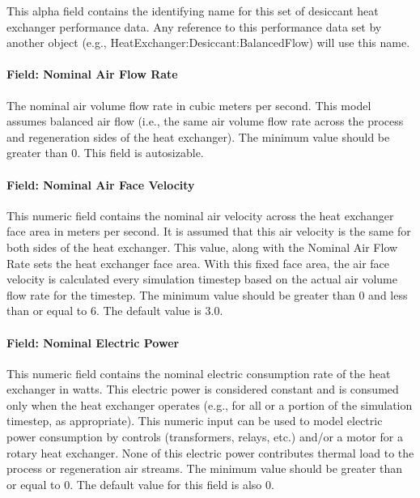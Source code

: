 This alpha field contains the identifying name for this set of desiccant heat exchanger performance data. Any reference to this performance data set by another object (e.g., HeatExchanger:Desiccant:BalancedFlow) will use this name.

\paragraph{Field: Nominal Air Flow Rate}\label{field-nominal-air-flow-rate}

The nominal air volume flow rate in cubic meters per second. This model assumes balanced air flow (i.e., the same air volume flow rate across the process and regeneration sides of the heat exchanger). The minimum value should be greater than 0. This field is autosizable.

\paragraph{Field: Nominal Air Face Velocity}\label{field-nominal-air-face-velocity}

This numeric field contains the nominal air velocity across the heat exchanger face area in meters per second. It is assumed that this air velocity is the same for both sides of the heat exchanger. This value, along with the Nominal Air Flow Rate sets the heat exchanger face area. With this fixed face area, the air face velocity is calculated every simulation timestep based on the actual air volume flow rate for the timestep. The minimum value should be greater than 0 and less than or equal to 6. The default value is 3.0.

\paragraph{Field: Nominal Electric Power}\label{field-nominal-electric-power-2}

This numeric field contains the nominal electric consumption rate of the heat exchanger in watts. This electric power is considered constant and is consumed only when the heat exchanger operates (e.g., for all or a portion of the simulation timestep, as appropriate). This numeric input can be used to model electric power consumption by controls (transformers, relays, etc.) and/or a motor for a rotary heat exchanger. None of this electric power contributes thermal load to the process or regeneration air streams. The minimum value should be greater than or equal to 0. The default value for this field is also 0.

